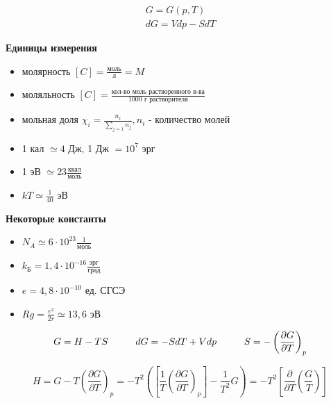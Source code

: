 \begin{lecture}
\begin{lecSection}
	\begin{align}
	G = G(p,T) \\
	dG = Vdp - SdT
	\end{align}
	
	\begin{center}
		\textbf{Единицы измерения}\\
	\end{center}
	
	\begin{itemize}
		\item молярность $[C] = \frac{\text{моль}}{\text{л}} = M$
		\item моляльность $[C] = \frac{\text{кол-во моль растворенного в-ва}}{\text{1000 г растворителя}}$
		\item мольная доля $\chi_i = \frac{n_i}{\sum\limits_{j=1} n_j}, n_i $ - количество молей
		\item 1 кал $\simeq 4$ Дж, 1 Дж $= 10^7$ эрг
		\item 1 эВ $\simeq 23 \frac{\text{ккал}}{\text{моль}}$
		\item $kT \simeq \frac{1}{40}$ эВ
	\end{itemize}
	
	\begin{center}
		\textbf{Некоторые константы}\\
	\end{center}
	
	\begin{itemize}
		\item $N_A \simeq 6 \cdot 10^{23} \frac{1}{\text{моль}}$
		\item $k_{\text{Б}} = 1,4 \cdot 10^{-16} \frac{\text{эрг}}{\text{град}}$
		\item $e = 4,8 \cdot 10^{-10}$ ед. СГСЭ
		\item $Rg = \frac{e^2}{2r} \simeq 13,6$ эВ
	\end{itemize}
	\end{lecSection}

	\begin{lecSection}

	
	\begin{equation}	
	\begin{aligned}
	G = H - TS \hspace*{1cm} dG = -SdT + Vdp \hspace*{1cm} S = - \left( \dfrac{\partial G}{\partial T} \right)_{p}
	\end{aligned}
	\end{equation}
	
	\begin{equation}
	H = G - T\left( \dfrac{\partial G}{\partial T} \right)_{p} = -T^2 \left(\left[\frac{1}{T}\left( \dfrac{\partial G}{\partial T} \right)_{p}\right] - \frac{1}{T^2}G\right) = -T^2 \left[\dfrac{\partial}{\partial T}\left(\frac{G}{T}\right)\right]
	\end{equation}
	

\end{lecSection}
\end{lecture}
